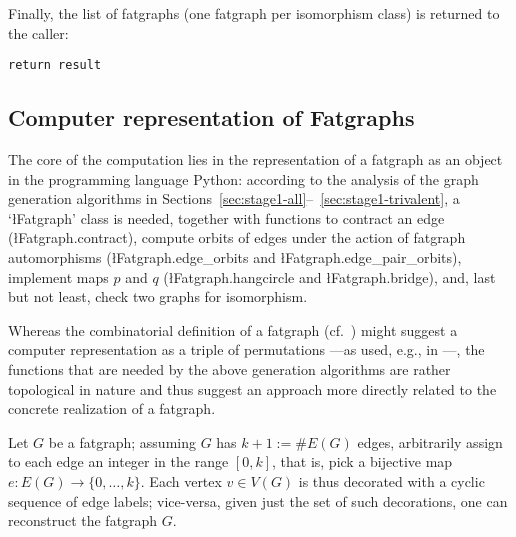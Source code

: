 Finally, the list of fatgraphs (one fatgraph per isomorphism class) is
returned to the caller:
\begin{lstlisting}[name=MgnTrivalentGraphs,firstnumber=50]
    return result
\end{lstlisting}


\subsection{Computer representation of Fatgraphs}
\label{sec:stage1-fatgraphs}

The core of the computation lies in the representation of a fatgraph
as an object in the programming language Python: according to the
analysis of the graph generation algorithms in
Sections~\ref{sec:stage1-all}--~\ref{sec:stage1-trivalent}, a
`\l{Fatgraph}' class is needed, together with functions to contract an
edge (\l{Fatgraph.contract}), compute orbits of edges under the action
of fatgraph automorphisms (\l{Fatgraph.edge_orbits} and
\l{Fatgraph.edge_pair_orbits}), implement maps $p$ and $q$
(\l{Fatgraph.hangcircle} and \l{Fatgraph.bridge}), and, last but not
least, check two graphs for isomorphism.

Whereas the combinatorial definition of a fatgraph
(cf.~) might suggest a computer representation as
a triple of permutations ---as used, e.g., in \cite[Section
2.4]{arXiv:0902.1025}---, the functions that are needed by the above
generation algorithms are rather topological in nature and thus
suggest an approach more directly related to the concrete realization
of a fatgraph.

Let $G$ be a fatgraph; assuming $G$ has $k+1 := \#E(G)$ edges,
arbitrarily assign to each edge an integer in the range $[0, k]$, that
is, pick a bijective map $e: E(G) \to \{0, \dots, k\}$.  Each vertex
$v \in V(G)$ is thus decorated with a cyclic sequence of edge labels;
vice-versa, given just the set of such decorations, one can
reconstruct the fatgraph $G$.

